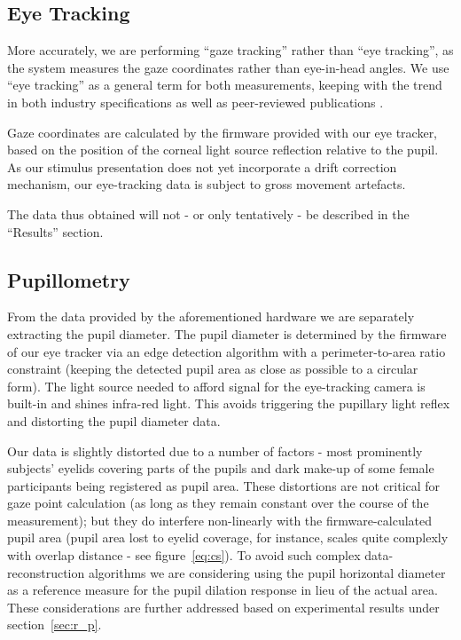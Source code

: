 	\subsection{Eye Tracking}\label{sec:m_om_et}
	    More accurately, we are performing “gaze tracking” rather than “eye tracking”, as the system measures the gaze coordinates rather than eye-in-head angles.
	    We use “eye tracking” as a general term for both measurements, keeping with the trend in both industry specifications \citep{Bojko2006} as well as peer-reviewed publications \citep{Kirk2013}.
	    
	    Gaze coordinates are calculated by the firmware provided with our eye tracker, based on the position of the corneal light source reflection relative to the pupil.
	    As our stimulus presentation does not yet incorporate a drift correction mechanism, our eye-tracking data is subject to gross movement artefacts.
	    
	    The data thus obtained will not - or only tentatively - be described in the “Results” section.
	\subsection{Pupillometry}\label{sec:m_om_pm}
	    From the data provided by the aforementioned hardware we are separately extracting the pupil diameter.
	    The pupil diameter is determined by the firmware of our eye tracker via an edge detection algorithm with a perimeter-to-area ratio constraint
	    (keeping the detected pupil area as close as possible to a circular form).
	    The light source needed to afford signal for the eye-tracking camera is built-in and shines infra-red light.
	    This avoids triggering the pupillary light reflex \citep{Ellis1981} and distorting the pupil diameter data.
	    
	    Our data is slightly distorted due to a number of factors - most prominently subjects' eyelids covering parts of the pupils and dark make-up of some female participants being registered as pupil area.
	    These distortions are not critical for gaze point calculation (as long as they remain constant over the course of the measurement); 
	    but they do interfere non-linearly with the firmware-calculated pupil area 
	    (pupil area lost to eyelid coverage, for instance, scales quite complexly with overlap distance - see figure~\ref{eq:cs}).
	    To avoid such complex data-reconstruction algorithms we are considering using the pupil horizontal diameter as a reference measure for the pupil dilation response in lieu of the actual area.
	    These considerations are further addressed based on experimental results under section~\ref{sec:r_p}.
	    
